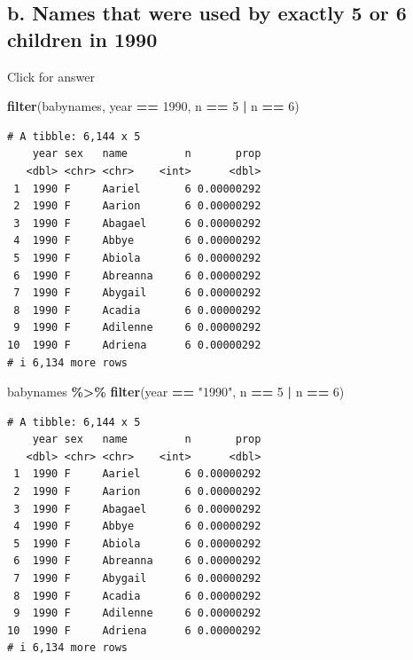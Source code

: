 \documentclass[
]{book}
\newenvironment{Shaded}{\begin{snugshade}}{\end{snugshade}}
\newcommand{\DecValTok}[1]{\textcolor[rgb]{0.00,0.00,0.81}{#1}}
\newcommand{\FunctionTok}[1]{\textcolor[rgb]{0.13,0.29,0.53}{\textbf{#1}}}
\newcommand{\NormalTok}[1]{#1}
\newcommand{\SpecialCharTok}[1]{\textcolor[rgb]{0.81,0.36,0.00}{\textbf{#1}}}
\newcommand{\StringTok}[1]{\textcolor[rgb]{0.31,0.60,0.02}{#1}}
\begin{document}
\hypertarget{b.-names-that-were-used-by-exactly-5-or-6-children-in-1990}{%
\subsection{b. Names that were used by exactly 5 or 6 children in 1990}\label{b.-names-that-were-used-by-exactly-5-or-6-children-in-1990}}

Click for answer

\begin{Shaded}
\begin{Highlighting}[]
\FunctionTok{filter}\NormalTok{(babynames, year }\SpecialCharTok{==} \DecValTok{1990}\NormalTok{, n }\SpecialCharTok{==} \DecValTok{5} \SpecialCharTok{|}\NormalTok{ n }\SpecialCharTok{==} \DecValTok{6}\NormalTok{)}
\end{Highlighting}
\end{Shaded}

\begin{verbatim}
# A tibble: 6,144 x 5
    year sex   name         n       prop
   <dbl> <chr> <chr>    <int>      <dbl>
 1  1990 F     Aariel       6 0.00000292
 2  1990 F     Aarion       6 0.00000292
 3  1990 F     Abagael      6 0.00000292
 4  1990 F     Abbye        6 0.00000292
 5  1990 F     Abiola       6 0.00000292
 6  1990 F     Abreanna     6 0.00000292
 7  1990 F     Abygail      6 0.00000292
 8  1990 F     Acadia       6 0.00000292
 9  1990 F     Adilenne     6 0.00000292
10  1990 F     Adriena      6 0.00000292
# i 6,134 more rows
\end{verbatim}

\begin{Shaded}
\begin{Highlighting}[]
\NormalTok{babynames }\SpecialCharTok{\%\textgreater{}\%} \FunctionTok{filter}\NormalTok{(year }\SpecialCharTok{==} \StringTok{"1990"}\NormalTok{, n }\SpecialCharTok{==} \DecValTok{5} \SpecialCharTok{|}\NormalTok{ n }\SpecialCharTok{==} \DecValTok{6}\NormalTok{)}
\end{Highlighting}
\end{Shaded}

\begin{verbatim}
# A tibble: 6,144 x 5
    year sex   name         n       prop
   <dbl> <chr> <chr>    <int>      <dbl>
 1  1990 F     Aariel       6 0.00000292
 2  1990 F     Aarion       6 0.00000292
 3  1990 F     Abagael      6 0.00000292
 4  1990 F     Abbye        6 0.00000292
 5  1990 F     Abiola       6 0.00000292
 6  1990 F     Abreanna     6 0.00000292
 7  1990 F     Abygail      6 0.00000292
 8  1990 F     Acadia       6 0.00000292
 9  1990 F     Adilenne     6 0.00000292
10  1990 F     Adriena      6 0.00000292
# i 6,134 more rows
\end{verbatim}
\end{document}
